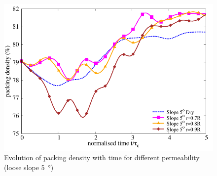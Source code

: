 \begin{figure}
\centering
\includegraphics[width=0.97\columnwidth]{Voronoi_5}
\caption{Evolution of packing density with time for different permeability (loose slope \SI{5}{\degree})}
\label{fig:voro5}
\end{figure}


